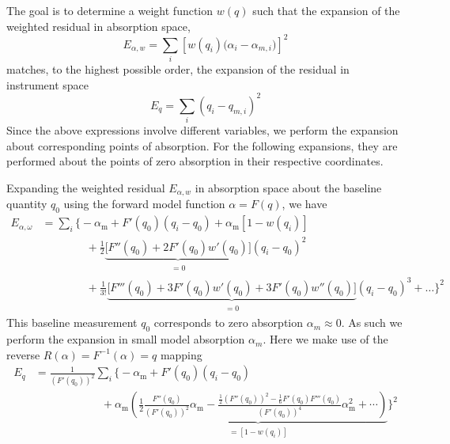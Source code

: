 \documentclass[12pt]{report}
\begin{document}
	The goal is to determine a weight function $w(q)$ such that the expansion of the weighted residual in absorption space,
	\begin{equation}
		E_{\alpha,w} = \sum_i \left[w(q_i)\big(\alpha_i - \alpha_{m,i}\big)\right]^2
	\end{equation}
	matches, to the highest possible order, the expansion of the residual in instrument space
	\begin{equation}
		E_q = \sum_i \left(q_i - q_{m,i}\right)^2
	\end{equation}
	Since the above expressions involve different variables, we perform the expansion about corresponding points of absorption. For the following expansions, they are performed about the points of zero absorption in their respective coordinates.
	
	Expanding the weighted residual $E_{\alpha,w}$ in absorption space about the baseline quantity $q_0$ using the forward model function $\alpha = F(q)$, we have
	\begin{align}
		E_{\alpha, \omega} &= \sum_i \Bigg\{
		-\alpha_\mathrm{m} + F'(q_0) (q_i-q_0) + \alpha_\mathrm{m}\left[1 - w(q_i)\right] \nonumber\\
		&\qquad\qquad + \frac{1}{2} \underbrace{\Big[F''(q_0) + 2 F'(q_0) w'(q_0)\Big]}_{\begin{matrix}=0\end{matrix}} (q_i-q_0)^2 \nonumber \\
		&\qquad\qquad + \frac{1}{3!}\underbrace{\Big[F'''(q_0) + 3 F'(q_0) w'(q_0) + 3F'(q_0)w''(q_0)\Big]}_{\begin{matrix}=0\end{matrix}} (q_i-q_0)^3 + \ldots
		\Bigg\}^2
	\end{align}
	This baseline measurement $q_0$ corresponds to zero absorption $\alpha_m \approx 0$. As such we perform the expansion in small model absorption $\alpha_m$. Here we make use of the reverse $R(\alpha) = F^{-1}(\alpha) = q $ mapping
	\begin{align}
		E_q &= \frac{1}{\left(F'(q_0)\right)^2} \sum_i \Bigg\{
		-\alpha_\mathrm{m} + F'(q_0)(q_i-q_0) \nonumber \\
		&\qquad\qquad\qquad + \alpha_\mathrm{m} \underbrace{\left(\frac{1}{2}\frac{F''(q_0)}{\left(F'(q_0)\right)^2}\alpha_\mathrm{m} - \frac{\frac{1}{2}\left(F''(q_0)\right)^2 - \frac{1}{6}F'(q_0) F'''(q_0)}{\left(F'(q_0)\right)^4}\alpha_\mathrm{m}^2 + \cdots\right)}_{\begin{matrix}=\left[1-w(q_i)\right]\end{matrix}}
		\Bigg\}^2
	\end{align}
\end{document}
